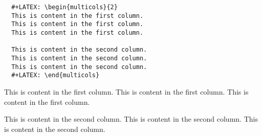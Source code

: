 \documentclass[10pt,article]{article}
\begin{document}
\begin{verbatim}
  #+LATEX: \begin{multicols}{2}
  This is content in the first column.
  This is content in the first column.
  This is content in the first column.

  This is content in the second column.
  This is content in the second column.
  This is content in the second column.
  #+LATEX: \end{multicols}
\end{verbatim}

\begin{multicols}{2}
This is content in the first column.
This is content in the first column.
This is content in the first column.

This is content in the second column.
This is content in the second column.
This is content in the second column.
\end{multicols}
\end{document}
